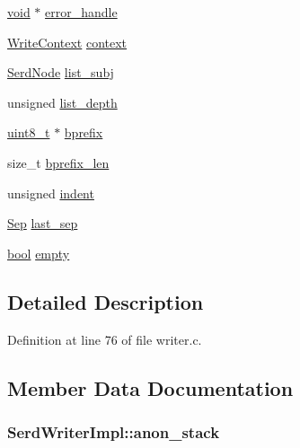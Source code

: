 \begin{DoxyCompactItemize}
\item 
\hyperlink{sound_8c_ae35f5844602719cf66324f4de2a658b3}{void} $\ast$ \hyperlink{struct_serd_writer_impl_a4f4255f8e32c3e1c7dfc0145fefc7788}{error\+\_\+handle}
\item 
\hyperlink{struct_write_context}{Write\+Context} \hyperlink{struct_serd_writer_impl_aba094b25116ebac728a7b329f45f1196}{context}
\item 
\hyperlink{struct_serd_node}{Serd\+Node} \hyperlink{struct_serd_writer_impl_a8434d419faad7889fd98a10b4255a848}{list\+\_\+subj}
\item 
unsigned \hyperlink{struct_serd_writer_impl_a976831995112596f11a736f94dad065a}{list\+\_\+depth}
\item 
\hyperlink{lib-src_2ffmpeg_2win32_2stdint_8h_a9a941819355e6f658991890ff66b4b0e}{uint8\+\_\+t} $\ast$ \hyperlink{struct_serd_writer_impl_aee52b0f37a85353b23532eac5782d553}{bprefix}
\item 
size\+\_\+t \hyperlink{struct_serd_writer_impl_ac164b6ed914e2eaf1db73113a103788a}{bprefix\+\_\+len}
\item 
unsigned \hyperlink{struct_serd_writer_impl_a9603d4b7de01f0d78fd064ebf9311fff}{indent}
\item 
\hyperlink{writer_8c_a050d7b0e8e309ae551d898749910ccf8}{Sep} \hyperlink{struct_serd_writer_impl_a9dcf031aeff870976bd44e4966c39835}{last\+\_\+sep}
\item 
\hyperlink{mac_2config_2i386_2lib-src_2libsoxr_2soxr-config_8h_abb452686968e48b67397da5f97445f5b}{bool} \hyperlink{struct_serd_writer_impl_af311634690e4a79ccacbac2d24f77b3c}{empty}
\end{DoxyCompactItemize}


\subsection{Detailed Description}


Definition at line 76 of file writer.\+c.



\subsection{Member Data Documentation}
\subsubsection[{\texorpdfstring{anon\+\_\+stack}{anon_stack}}]{ Serd\+Writer\+Impl\+::anon\+\_\+stack}\hypertarget{struct_serd_writer_impl_acf6119b5c84e08398304c8e0101161a9}{}\label{struct_serd_writer_impl_acf6119b5c84e08398304c8e0101161a9}


